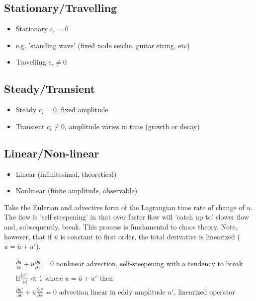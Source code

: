 \documentclass[a4paper,12pt]{article}
\begin{document}
\subsection*{Stationary/Travelling}
\begin{itemize}
	\item Stationary $c_r = 0$
	\item e.g. 'standing wave' (fixed node seiche, guitar string, etc)
	\item Travelling $c_r \neq 0$
\end{itemize}

\subsection*{Steady/Transient}
\begin{itemize}
	\item Steady $c_i = 0$, fixed amplitude
	\item Transient $c_i \neq 0$, amplitude varies in time (growth or decay)
\end{itemize}

\subsection*{Linear/Non-linear}
\begin{itemize}
	\item Linear (infinitesimal, theoretical)
	\item Nonlinear (finite amplitude, observable)
\end{itemize}

Take the Eulerian and advective form of the Lagrangian time rate of change of $u$. The flow is 'self-steepening' in that over faster flow will 'catch up to' slower flow and, subsequently, break. This process is fundamental to chaos theory. Note, however, that if $\overline{u}$ is constant to first order, the total derivative is linearized ($u = \overline{u} + u'$).

\begin{align*}
\frac{\partial u}{\partial t} + u\frac{\partial u}{\partial x} = 0 \text{ nonlinear advection, self-steepening with a tendency to break}\\
\text{If} \frac{|u'|}{|\overline{u}|} \ll 1 \text{ where } u = \overline{u} + u' \text{ then}\\
\frac{\partial u'}{\partial t} + \overline{u}\frac{\partial u'}{\partial x} = 0 \text{ advection linear in eddy amplitude $u'$, linearized operator}
\end{align*}
\end{document}
